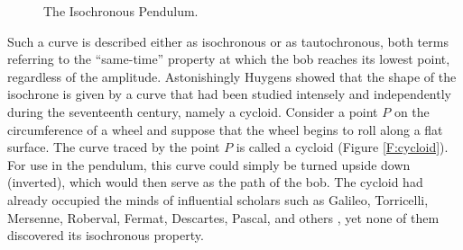 \documentclass[12pt]{article}
\theoremstyle{definition}
\newcommand{\bu}{\bullet}
\begin{document}
\begin{figure}[htb] 
\begin{center}
\end{center}
\caption{The Isochronous Pendulum.} \label{F:iso-pendulum}
\end{figure}

Such a curve is described either as isochronous or as 
tautochronous, both terms referring to the ``same-time'' property at
which the bob reaches its lowest point, regardless of the amplitude.
Astonishingly Huygens showed that the shape of the isochrone is
given by a curve that had been studied intensely and independently
during the seventeenth century, namely a cycloid.  Consider a point
$P$ on the circumference of a wheel and suppose that the wheel begins
to roll along a flat surface.  The curve traced by the point $P$
is called a cycloid (Figure \ref{F:cycloid}).  
For use in the pendulum, this curve could simply be turned
upside down (inverted), which would then serve as the path of the bob.
The cycloid had already occupied the minds of influential scholars 
such as Galileo, Torricelli, Mersenne, Roberval, Fermat, Descartes, 
Pascal, and others \cite{Boyer}, yet none of them discovered its 
isochronous property.
\end{document}
